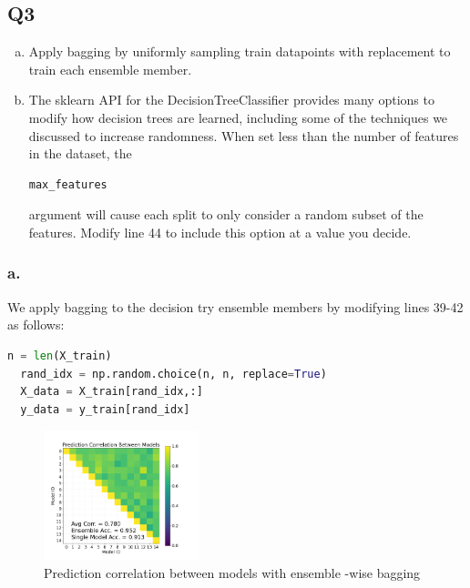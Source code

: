 \documentclass{article}
\theoremstyle{definition}
\begin{document}
    \subsection*{Q3}
        \begin{mdframed}
            \begin{enumerate}[a.]
                \item Apply bagging by uniformly sampling train datapoints 
                    with replacement to train each ensemble member.
                \item The sklearn API for the DecisionTreeClassifier 
                    provides many options to modify how decision trees 
                    are learned, including some of the techniques we 
                    discussed to increase randomness. When set less than 
                    the number of features in the dataset, the 
                    \begin{verbatim}max_features\end{verbatim}
                    argument will cause each split to only consider a 
                    random subset of the features. Modify line 44 to 
                    include this option at a value you decide.
            \end{enumerate}
        \end{mdframed}
        \subsubsection*{a.}
            We apply bagging to the decision try ensemble members by 
            modifying lines 39-42 as follows:
            \begin{lstlisting}[language=python]
  n = len(X_train)
  rand_idx = np.random.choice(n, n, replace=True)
  X_data = X_train[rand_idx,:]
  y_data = y_train[rand_idx]
            \end{lstlisting}
            \begin{figure}[htpb]
                \centering
                \includegraphics[width=0.4\textwidth]{figures/q3_a.png}
                \caption{Prediction correlation between models with ensemble
                -wise bagging}
                \label{fig:}
            \end{figure}
\end{document}

